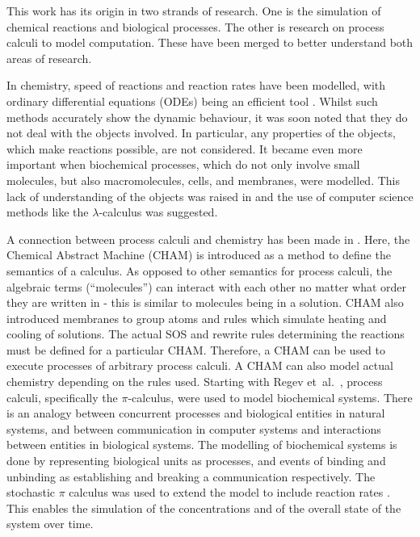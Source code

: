 ﻿This work has its origin in two strands of research. One is the simulation of chemical reactions and biological processes. The other is research on process calculi to model computation. These have been merged  to better understand both areas of research. 

In chemistry, speed of reactions and reaction rates have been modelled, with ordinary differential equations (ODEs) being an efficient tool \cite{higham}. Whilst such methods accurately show the dynamic behaviour, it was soon noted that they do not deal with the objects involved. In particular, any properties of the objects, which make reactions possible, are not considered. 
It became even more important when biochemical processes, which do not only involve small molecules, but also macromolecules, cells, and membranes, were modelled. This lack of understanding of the objects was raised in \cite{fontana} and the use of computer science methods like the $\lambda$-calculus was suggested. 

A connection between process calculi and chemistry has been made in \cite{chamjournal}. Here, the Chemical Abstract Machine (CHAM) is introduced as a method to define the semantics of a calculus. As opposed to other semantics for process calculi, the algebraic terms (``molecules'') can interact with each other no matter what order they are written in - this is similar to molecules being in a solution. CHAM also introduced membranes to group atoms and rules which simulate heating and cooling of solutions. The actual SOS and rewrite rules determining the reactions must be defined for a particular CHAM. Therefore, a CHAM can be used to execute processes of arbitrary process calculi. A CHAM can also model actual chemistry depending on the rules used. Starting with Regev et~al.~\cite{regev2000}, process calculi, specifically the $\pi$-calculus, were used to model biochemical systems. There is an analogy between concurrent processes and biological entities in natural systems, and between communication in computer systems and interactions between entities in biological systems. The modelling of biochemical systems is done by representing biological units as processes, and events of binding and unbinding as establishing and breaking a communication respectively. %
The stochastic $\pi$ calculus \cite{PriamiStochasticPi} was used to extend the model to include reaction rates \cite{PriameRegev}. This enables the simulation of the concentrations and of the overall state of the system over time. 

